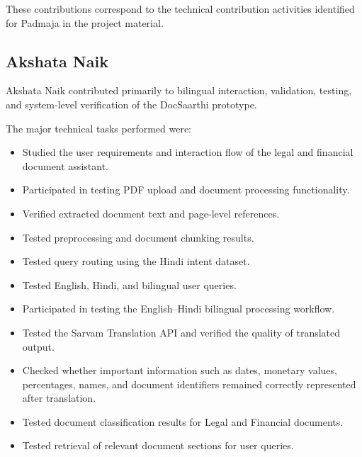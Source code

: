 These contributions correspond to the technical contribution
activities identified for Padmaja in the project material.

\subsection{Akshata Naik}

Akshata Naik contributed primarily to bilingual interaction,
validation, testing, and system-level verification of the DocSaarthi
prototype.

The major technical tasks performed were:

\begin{itemize}

    \item Studied the user requirements and interaction flow of the
    legal and financial document assistant.

    \item Participated in testing PDF upload and document processing
    functionality.

    \item Verified extracted document text and page-level references.

    \item Tested preprocessing and document chunking results.

    \item Tested query routing using the Hindi intent dataset.

    \item Tested English, Hindi, and bilingual user queries.

    \item Participated in testing the English--Hindi bilingual
    processing workflow.

    \item Tested the Sarvam Translation API and verified the quality
    of translated output.

    \item Checked whether important information such as dates,
    monetary values, percentages, names, and document identifiers
    remained correctly represented after translation.

    \item Tested document classification results for Legal and
    Financial documents.

    \item Tested retrieval of relevant document sections for user
    queries.


\end{itemize}
